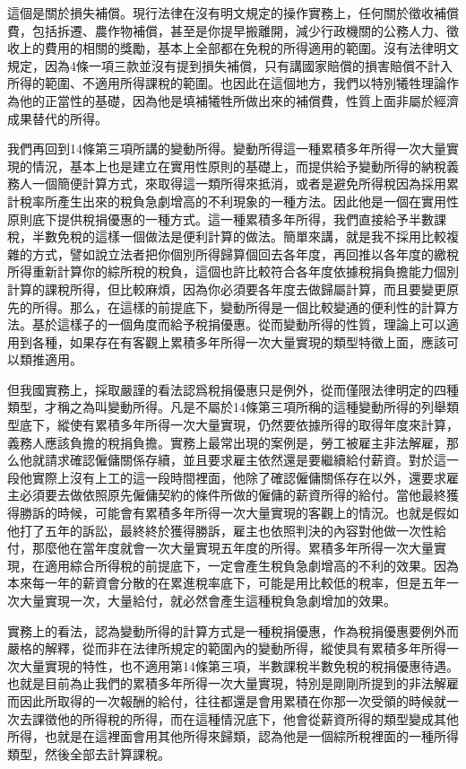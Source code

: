 \documentclass[]{ctexbook}
\begin{document}
這個是關於損失補償。現行法律在沒有明文規定的操作實務上，任何關於徵收補償費，包括拆遷、農作物補償，甚至是你提早搬離開，減少行政機關的公務人力、徵收上的費用的相關的獎勵，基本上全部都在免稅的所得適用的範圍。沒有法律明文規定，因為4條一項三款並沒有提到損失補償，只有講國家賠償的損害賠償不計入所得的範圍、不適用所得課稅的範圍。也因此在這個地方，我們以特別犧牲理論作為他的正當性的基礎，因為他是填補犧牲所做出來的補償費，性質上面非屬於經濟成果替代的所得。

我們再回到14條第三項所講的變動所得。變動所得這一種累積多年所得一次大量實現的情況，基本上也是建立在實用性原則的基礎上，而提供給予變動所得的納稅義務人一個簡便計算方式，來取得這一類所得來抵消，或者是避免所得稅因為採用累計稅率所產生出來的稅負急劇增高的不利現象的一種方法。因此他是一個在實用性原則底下提供稅捐優惠的一種方式。這一種累積多年所得，我們直接給予半數課稅，半數免稅的這樣一個做法是便利計算的做法。簡單來講，就是我不採用比較複雜的方式，譬如說立法者把你個別所得歸算個回去各年度，再回推以各年度的繳稅所得重新計算你的綜所稅的稅負，這個也許比較符合各年度依據稅捐負擔能力個別計算的課稅所得，但比較麻煩，因為你必須要各年度去做歸屬計算，而且要變更原先的所得。那么，在這樣的前提底下，變動所得是一個比較變通的便利性的計算方法。基於這樣子的一個角度而給予稅捐優惠。從而變動所得的性質，理論上可以適用到各種，如果存在有客觀上累積多年所得一次大量實現的類型特徵上面，應該可以類推適用。

但我國實務上，採取嚴謹的看法認爲稅捐優惠只是例外，從而僅限法律明定的四種類型，才稱之為叫變動所得。凡是不屬於14條第三項所稱的這種變動所得的列舉類型底下，縱使有累積多年所得一次大量實現，仍然要依據所得的取得年度來計算，義務人應該負擔的稅捐負擔。實務上最常出現的案例是，勞工被雇主非法解雇，那么他就請求確認僱傭關係存續，並且要求雇主依然還是要繼續給付薪資。對於這一段他實際上沒有上工的這一段時間裡面，他除了確認僱傭關係存在以外，還要求雇主必須要去做依照原先僱傭契約的條件所做的僱傭的薪資所得的給付。當他最終獲得勝訴的時候，可能會有累積多年所得一次大量實現的客觀上的情況。也就是假如他打了五年的訴訟，最終終於獲得勝訴，雇主也依照判決的內容對他做一次性給付，那麼他在當年度就會一次大量實現五年度的所得。累積多年所得一次大量實現，在適用綜合所得稅的前提底下，一定會產生稅負急劇增高的不利的效果。因為本來每一年的薪資會分散的在累進稅率底下，可能是用比較低的稅率，但是五年一次大量實現一次，大量給付，就必然會產生這種稅負急劇增加的效果。

實務上的看法，認為變動所得的計算方式是一種稅捐優惠，作為稅捐優惠要例外而嚴格的解釋，從而非在法律所規定的範圍內的變動所得，縱使具有累積多年所得一次大量實現的特性，也不適用第14條第三項，半數課稅半數免稅的稅捐優惠待遇。也就是目前為止我們的累積多年所得一次大量實現，特別是剛剛所提到的非法解雇而因此所取得的一次報酬的給付，往往都還是會用累積在你那一次受領的時候就一次去課徵他的所得稅的所得，而在這種情況底下，他會從薪資所得的類型變成其他所得，也就是在這裡面會用其他所得來歸類，認為他是一個綜所稅裡面的一種所得類型，然後全部去計算課稅。
\end{document}
